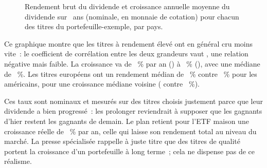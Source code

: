 \begin{figure}[htbp]
  \centering
  \caption{Rendement brut du dividende et croissance annuelle moyenne du dividende sur
  \RegleAnneesCroissance~ans (nominale, en monnaie de cotation) pour chacun des \NombreTitres{}
  titres du portefeuille-exemple, par pays.}\label{fig:rendement-contre-croissance}
\end{figure}

Ce graphique montre que les titres \`a rendement \'elev\'e ont en g\'en\'eral cru moins vite~: le
coefficient de corr\'elation entre les deux grandeurs vaut \CorrelationRendementCroissance, une
relation n\'egative mais faible. La croissance va de \CroissanceTitreMin~\% par an
(\CroissanceTitreMinTicker) \`a \CroissanceTitreMax~\% (\CroissanceTitreMaxTicker), avec une m\'ediane
de \CroissanceMediane~\%. Les titres europ\'eens ont un rendement m\'edian de
\RenditeMedianeEurope~\% contre \RenditeMedianeUs~\% pour les am\'ericains, pour une croissance
m\'ediane voisine (\CroissanceMedianeEurope{} contre \CroissanceMedianeUs~\%).

 Ces
taux sont nominaux et mesur\'es sur des titres choisis justement parce que leur dividende a bien
progress\'e~: les prolonger reviendrait \`a supposer que les gagnants d'hier restent les gagnants de
demain. Le plan retient pour l'ETF maison une croissance r\'eelle de \CroissanceModeleMaison~\% par
an, celle qui laisse son rendement total au niveau du march\'e. La presse sp\'ecialis\'ee rappelle \`a
juste titre que des titres de qualit\'e portent la croissance d'un portefeuille \`a long
terme~; cela ne dispense pas de ce r\'ealisme.

